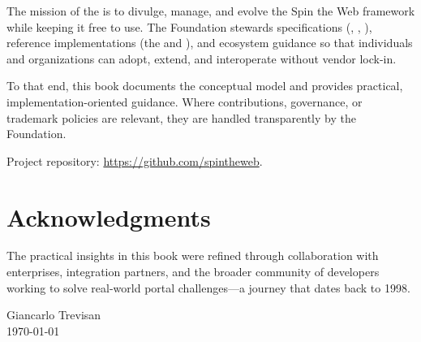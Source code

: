 The mission of the \organization{} is to divulge, manage, and evolve the Spin the Web framework while keeping it free to use. The Foundation stewards specifications (\wbdl, \wbpl, \wbll), reference implementations (the \webspinner and \studio), and ecosystem guidance so that individuals and organizations can adopt, extend, and interoperate without vendor lock-in.

To that end, this book documents the conceptual model and provides practical, implementation-oriented guidance. Where contributions, governance, or trademark policies are relevant, they are handled transparently by the Foundation.

Project repository: \url{https://github.com/spintheweb}.

\section*{Acknowledgments}

The practical insights in this book were refined through collaboration with enterprises, integration partners, and the broader community of developers working to solve real-world portal challenges---a journey that dates back to 1998.

\vspace{1cm}
\nopagebreak
\hfill Giancarlo Trevisan \\
\hfill \today
